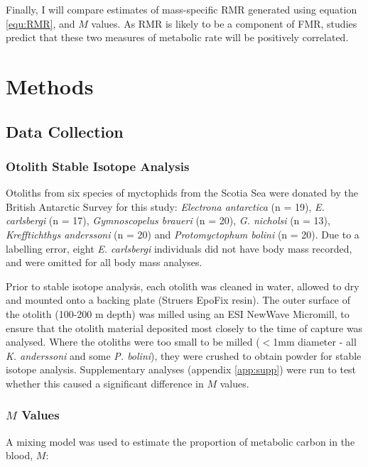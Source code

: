 \documentclass[12pt, titlepage]{article}
\begin{document}
Finally, I will compare estimates of mass-specific RMR generated using equation \ref{equ:RMR}, and $M$ values.
As RMR is likely to be a component of FMR, studies predict that these two measures of metabolic rate will be positively correlated. %

\pagebreak
\section{Methods}

\subsection{Data Collection}
\label{sec:data}

\subsubsection{Otolith Stable Isotope Analysis}

Otoliths from six species of myctophids from the Scotia Sea were donated by the British Antarctic Survey for this study: \textit{Electrona antarctica} (n = 19), \textit{E. carlsbergi} (n = 17), \textit{Gymnoscopelus braueri} (n = 20), \textit{G. nicholsi} (n = 13), \textit{Krefftichthys anderssoni} (n = 20) and \textit{Protomyctophum bolini} (n = 20).
Due to a labelling error, eight \textit{E. carlsbergi} individuals did not have body mass recorded, and were omitted for all body mass analyses.

Prior to stable isotope analysis, each otolith was cleaned in water, allowed to dry and mounted onto a backing plate (Struers EpoFix resin).
The outer surface of the otolith (100-200 \textmu m depth) was milled using an ESI NewWave Micromill, to ensure that the otolith material deposited most closely to the time of capture was analysed.
Where the otoliths were too small to be milled ($<$1mm diameter - all \textit{K. anderssoni} and some \textit{P. bolini}), they were crushed to obtain powder for stable isotope analysis.
Supplementary analyses (appendix \ref{app:supp}) were run to test whether this caused a significant difference in $M$ values.

\subsubsection{$M$ Values}
\label{sec:M}

A mixing model was used to estimate the proportion of metabolic carbon in the blood, $M$:
\end{document}

